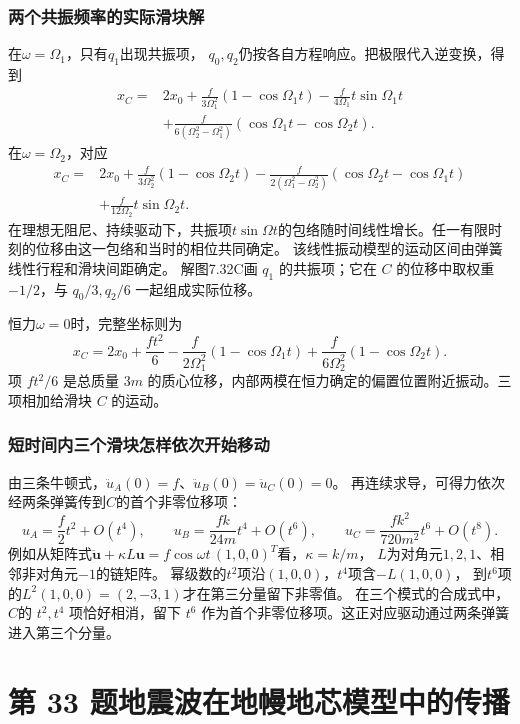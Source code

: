 \documentclass[UTF8,fontset=fandol,a4paper,11pt]{ctexart}
\begin{document}
\subsubsection*{两个共振频率的实际滑块解}
在$\omega=\Omega_1$，只有$q_1$出现共振项，
$q_0,q_2$仍按各自方程响应。把极限代入逆变换，得到
\[
\begin{aligned}
x_C={}&2x_0+\frac f{3\Omega_1^2}(1-\cos\Omega_1t)
-\frac f{4\Omega_1}t\sin\Omega_1t\\
&+\frac f{6(\Omega_2^2-\Omega_1^2)}
(\cos\Omega_1t-\cos\Omega_2t).
\end{aligned}
\]
在$\omega=\Omega_2$，对应
\[
\begin{aligned}
x_C={}&2x_0+\frac f{3\Omega_2^2}(1-\cos\Omega_2t)
-\frac f{2(\Omega_1^2-\Omega_2^2)}
(\cos\Omega_2t-\cos\Omega_1t)\\
&+\frac f{12\Omega_2}t\sin\Omega_2t.
\end{aligned}
\]
在理想无阻尼、持续驱动下，共振项$t\sin\Omega t$的包络随时间线性增长。任一有限时刻的位移由这一包络和当时的相位共同确定。
该线性振动模型的运动区间由弹簧线性行程和滑块间距确定。
解图7.32C画 $q_1$ 的共振项；它在 $C$ 的位移中取权重 $-1/2$，与 $q_0/3,q_2/6$ 一起组成实际位移。

恒力$\omega=0$时，完整坐标则为
\[
x_C=2x_0+\frac{ft^2}{6}
-\frac f{2\Omega_1^2}(1-\cos\Omega_1t)
+\frac f{6\Omega_2^2}(1-\cos\Omega_2t).
\]
项 $ft^2/6$ 是总质量 $3m$ 的质心位移，内部两模在恒力确定的偏置位置附近振动。三项相加给滑块 $C$ 的运动。

\subsubsection*{短时间内三个滑块怎样依次开始移动}
由三条牛顿式，$\ddot u_A(0)=f$、$\ddot u_B(0)=\ddot u_C(0)=0$。
再连续求导，可得力依次经两条弹簧传到$C$的首个非零位移项：
\[
u_A=\frac f2t^2+O(t^4),\qquad
u_B=\frac{fk}{24m}t^4+O(t^6),\qquad
u_C=\frac{fk^2}{720m^2}t^6+O(t^8).
\]
例如从矩阵式$\ddot{\boldsymbol u}+\kappa L\boldsymbol u
=f\cos\omega t\,(1,0,0)^T$看，$\kappa=k/m$，
$L$为对角元$1,2,1$、相邻非对角元$-1$的链矩阵。
幂级数的$t^2$项沿$(1,0,0)$，$t^4$项含$-L(1,0,0)$，
到$t^6$项的$L^2(1,0,0)=(2,-3,1)$才在第三分量留下非零值。
在三个模式的合成式中，$C$的 $t^2,t^4$ 项恰好相消，留下 $t^6$ 作为首个非零位移项。这正对应驱动通过两条弹簧进入第三个分量。




\section*{第 33 题\quad 地震波在地幔地芯模型中的传播}
\end{document}
